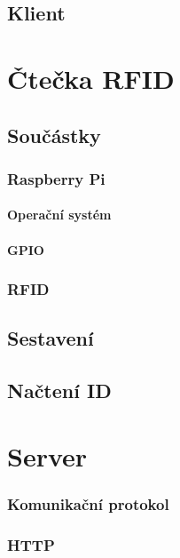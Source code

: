 \documentclass{bakalarka}
\begin{document}
	\section{Klient}
	
	

\chapter{Čtečka RFID}

	\section{Součástky}

		\subsection{Raspberry Pi}

			\subsubsection{Operační systém}

			\subsubsection{GPIO}

		\subsection{RFID}
	
	\section{Sestavení}

	\section{Načtení ID}



\chapter{Server}
		\subsection{Komunikační protokol}
			\subsection{HTTP}
		
\end{document}
